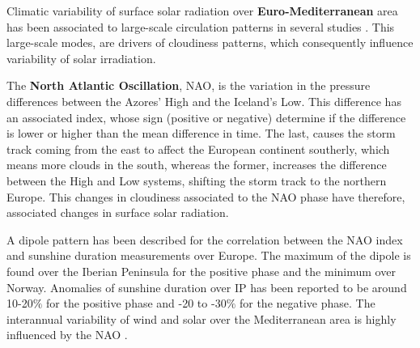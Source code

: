 
Climatic variability of surface solar radiation over \textbf{Euro-Mediterranean} area has been associated to large-scale circulation patterns in several studies \cite*{Jerez2013a, Chiacchio2010, Sanchez-Lorenzo2009, Pozo-Vazquez2004}. This large-scale modes, are drivers of cloudiness patterns, which consequently influence variability of solar irradiation.

The \textbf{North Atlantic Oscillation}, NAO, is the variation in the pressure differences between the Azores' High and the Iceland's Low. This difference has an associated index, whose sign (positive or negative) determine if the difference is lower or higher than the mean difference in time. The last, causes the storm track coming from the east to affect the European continent southerly, which means more clouds in the south, whereas the former, increases the difference between the High and Low systems, shifting the storm track to the northern Europe. This changes in cloudiness associated to the NAO phase have therefore, associated changes in surface solar radiation.

A dipole pattern has been described for the correlation between the NAO index and sunshine duration measurements \cite*{Pozo-Vazquez2004} over Europe. The maximum of the dipole is found over the Iberian Peninsula for the positive phase and the minimum over Norway. Anomalies of sunshine duration over IP has been reported to be around 10-20$\%$ for the positive phase and -20 to -30$\%$ for the negative phase. The interannual variability of wind and solar over the Mediterranean area is highly influenced by the NAO \cite*{pozo-Vazquez2011}.

